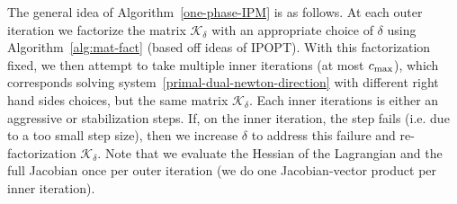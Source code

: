 \documentclass{article}
\begin{document}
The general idea of Algorithm~\ref{one-phase-IPM} is as follows. At each outer iteration we factorize the matrix $\mathcal{K}_{\delta}$ with an appropriate choice of $\delta$ using Algorithm~\ref{alg:mat-fact} (based off ideas of IPOPT). With this factorization fixed, we then attempt to take multiple inner iterations (at most $c_{\max}$), which corresponds solving system~\eqref{primal-dual-newton-direction} with different right hand sides choices, but the same matrix $\mathcal{K}_{\delta}$. Each inner iterations is either an aggressive or stabilization steps. If, on the inner iteration, the step fails (i.e. due to a too small step size), then we increase $\delta$ to address this failure and re-factorization $\mathcal{K}_{\delta}$. Note that we evaluate the Hessian of the Lagrangian and the full Jacobian once per outer iteration (we do one Jacobian-vector product per inner iteration).


\end{document}
